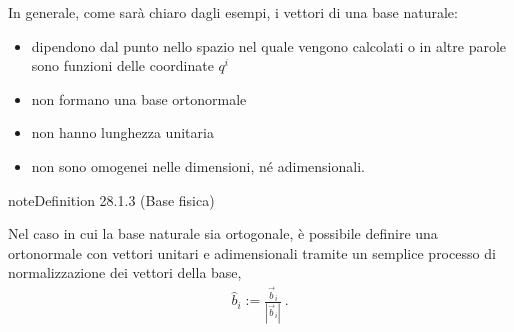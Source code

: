 \documentclass[letterpaper,10pt,italian]{jupyterBook}
\begin{document}
\sphinxAtStartPar
In generale, come sarà chiaro dagli esempi, i vettori di una base naturale:
\begin{itemize}
\item {} 
\sphinxAtStartPar
dipendono dal punto nello spazio nel quale vengono calcolati \sphinxhyphen{} o in altre parole sono funzioni delle coordinate \(q^i\)

\item {} 
\sphinxAtStartPar
non formano una base orto\sphinxhyphen{}normale

\item {} 
\sphinxAtStartPar
non hanno lunghezza unitaria

\item {} 
\sphinxAtStartPar
non sono omogenei nelle dimensioni, né adimensionali.

\end{itemize}
\label{ch/vector-calculus/geometry:definition-7}
\begin{sphinxadmonition}{note}{Definition 28.1.3 (Base fisica)}



\sphinxAtStartPar
Nel caso in cui la base naturale sia ortogonale, è possibile definire una  \sphinxhyphen{} orto\sphinxhyphen{}normale con vettori unitari e adimensionali \sphinxhyphen{} tramite un semplice processo di normalizzazione dei vettori della base,
\begin{equation*}
\begin{split}\hat{b}_i := \frac{\vec{b}_i}{|\vec{b}_i|} \ .\end{split}
\end{equation*}\end{sphinxadmonition}
\end{document}
